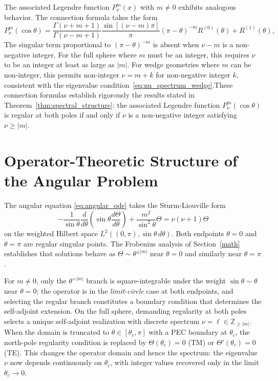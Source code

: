 \documentclass[
  aip,
  amsmath,amssymb,
  preprint
]{revtex4-1}
\begin{document}
The associated Legendre function $P_\nu^m(x)$ with $m \neq 0$ exhibits analogous behavior. The connection formula takes the form
\begin{equation}
P_\nu^m(\cos\theta) = \frac{\Gamma(\nu+m+1)}{\Gamma(\nu-m+1)}\frac{\sin[(\nu-m)\pi]}{\pi}(\pi-\theta)^{-m}R^{(0)}(\theta) + R^{(1)}(\theta),
\label{eq:Pnum_connection}
\end{equation}
The singular term proportional to $(\pi - \theta)^{-m}$ is absent when $\nu - m$ is a non-negative integer. For the full sphere where $m$ must be an integer, this requires $\nu$ to be an integer at least as large as $|m|$. For wedge geometries where $m$ can be non-integer, this permits non-integer $\nu = m + k$ for non-negative integer $k$, consistent with the eigenvalue condition~\eqref{eq:nu_spectrum_wedge}.These connection formulas establish rigorously the results stated in Theorem~\ref{thm:spectral_structure}: the associated Legendre function $P_\nu^m(\cos\theta)$ is regular at both poles if and only if $\nu$ is a non-negative integer satisfying $\nu \geq |m|$.

\section{Operator-Theoretic Structure of the Angular Problem}
\label{app:operator}
The angular equation \eqref{eq:angular_ode} takes the Sturm-Liouville form
\begin{equation}
-\frac{1}{\sin\theta}\frac{d}{d\theta}\left(\sin\theta\frac{d\Theta}{d\theta}\right) 
+ \frac{m^2}{\sin^2\theta}\Theta = \nu(\nu+1)\Theta
\end{equation}
on the weighted Hilbert space $L^2((0,\pi), \sin\theta\,d\theta)$. Both endpoints 
$\theta = 0$ and $\theta = \pi$ are regular singular points. The Frobenius 
analysis of Section~\ref{math} establishes that solutions behave as 
$\Theta \sim \theta^{\pm|m|}$ near $\theta = 0$ and similarly near $\theta = \pi$.

For $m \neq 0$, only the $\theta^{+|m|}$ branch is square-integrable under the 
weight $\sin\theta \sim \theta$ near $\theta = 0$; the operator is in the 
\emph{limit-circle} case at both endpoints, and selecting the regular branch 
constitutes a boundary condition that determines the self-adjoint extension. 
On the full sphere, demanding regularity at both poles selects a unique 
self-adjoint realization with discrete spectrum $\nu = \ell \in \mathbb{Z}_{\geq |m|}$.
When the domain is truncated to $\theta \in [\theta_c, \pi]$ with a PEC boundary 
at $\theta_c$, the north-pole regularity condition is replaced by 
$\Theta(\theta_c) = 0$ (TM) or $\Theta'(\theta_c) = 0$ (TE). This changes the 
operator domain and hence the spectrum: the eigenvalue $\nu$ now depends 
continuously on $\theta_c$, with integer values recovered only in the limit 
$\theta_c \to 0$.
\end{document}
